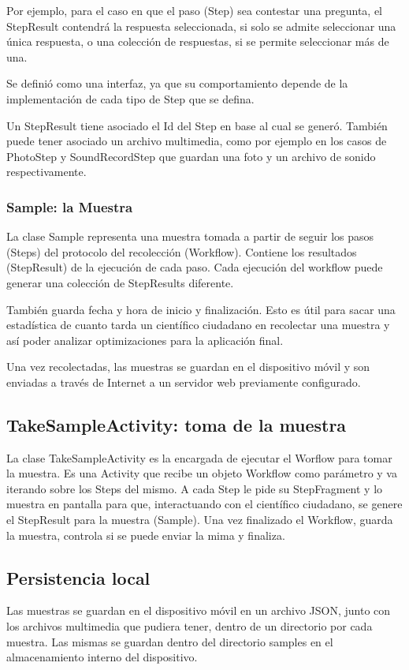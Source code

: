 Por ejemplo, para el caso en que el paso (Step) sea contestar una pregunta, el StepResult contendrá la respuesta seleccionada, si solo se admite seleccionar una única respuesta, o una colección de respuestas, si se permite seleccionar más de una.

Se definió como una interfaz, ya que su comportamiento depende de la implementación de cada tipo de Step que se defina.

Un StepResult tiene asociado el Id del Step en base al cual se generó. También puede tener asociado un archivo multimedia, como por ejemplo en los casos de PhotoStep y SoundRecordStep que guardan una foto y un archivo de sonido respectivamente.


\subsubsection{Sample: la Muestra}
La clase Sample representa una muestra tomada a partir de seguir los pasos (Steps) del protocolo del recolección (Workflow). Contiene los resultados (StepResult) de la ejecución de cada paso. Cada ejecución del workflow puede generar una colección de StepResults diferente.

También guarda fecha y hora de inicio y finalización. Esto es útil para sacar una estadística de cuanto tarda un científico ciudadano en recolectar una muestra y así poder analizar optimizaciones para la aplicación final.

Una vez recolectadas, las muestras se guardan en el dispositivo móvil y son enviadas a través de Internet a un servidor web previamente configurado.

\subsection{TakeSampleActivity: toma de la muestra}
La clase TakeSampleActivity es la encargada de ejecutar el Worflow para tomar la muestra. Es una Activity que recibe un objeto Workflow como parámetro y va iterando sobre los Steps del mismo. A cada Step le pide su StepFragment y lo muestra en pantalla para que, interactuando con el científico ciudadano, se genere el StepResult para la muestra (Sample). Una vez finalizado el Workflow, guarda la muestra, controla si se puede enviar la mima y finaliza.



\subsection{Persistencia local}
Las muestras se guardan en el dispositivo móvil en un archivo JSON, junto con los archivos multimedia que pudiera tener, dentro de un directorio por cada muestra. Las mismas se guardan dentro del directorio samples en el almacenamiento interno del dispositivo.


